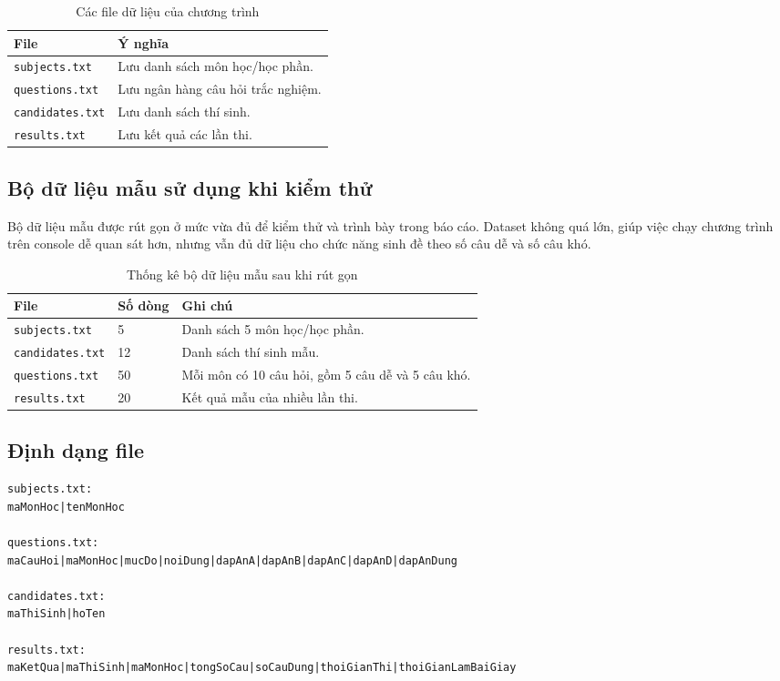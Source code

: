 \documentclass[12pt,a4paper]{article}
\begin{document}
\begin{table}[H]
\centering
\begin{tabular}{|p{4cm}|p{10cm}|}
\hline
\textbf{File} & \textbf{Ý nghĩa} \\
\hline
\texttt{subjects.txt} & Lưu danh sách môn học/học phần. \\
\hline
\texttt{questions.txt} & Lưu ngân hàng câu hỏi trắc nghiệm. \\
\hline
\texttt{candidates.txt} & Lưu danh sách thí sinh. \\
\hline
\texttt{results.txt} & Lưu kết quả các lần thi. \\
\hline
\end{tabular}
\caption{Các file dữ liệu của chương trình}
\end{table}

\subsection{Bộ dữ liệu mẫu sử dụng khi kiểm thử}

Bộ dữ liệu mẫu được rút gọn ở mức vừa đủ để kiểm thử và trình bày trong báo cáo. Dataset không quá lớn, giúp việc chạy chương trình trên console dễ quan sát hơn, nhưng vẫn đủ dữ liệu cho chức năng sinh đề theo số câu dễ và số câu khó.

\begin{table}[H]
\centering
\begin{tabular}{|p{4cm}|p{3cm}|p{7cm}|}
\hline
\textbf{File} & \textbf{Số dòng} & \textbf{Ghi chú} \\
\hline
\texttt{subjects.txt} & 5 & Danh sách 5 môn học/học phần. \\
\hline
\texttt{candidates.txt} & 12 & Danh sách thí sinh mẫu. \\
\hline
\texttt{questions.txt} & 50 & Mỗi môn có 10 câu hỏi, gồm 5 câu dễ và 5 câu khó. \\
\hline
\texttt{results.txt} & 20 & Kết quả mẫu của nhiều lần thi. \\
\hline
\end{tabular}
\caption{Thống kê bộ dữ liệu mẫu sau khi rút gọn}
\end{table}

\subsection{Định dạng file}

\begin{lstlisting}[style=cppstyle, caption={Định dạng dữ liệu text}]
subjects.txt:
maMonHoc|tenMonHoc

questions.txt:
maCauHoi|maMonHoc|mucDo|noiDung|dapAnA|dapAnB|dapAnC|dapAnD|dapAnDung

candidates.txt:
maThiSinh|hoTen

results.txt:
maKetQua|maThiSinh|maMonHoc|tongSoCau|soCauDung|thoiGianThi|thoiGianLamBaiGiay
\end{lstlisting}
\end{document}
